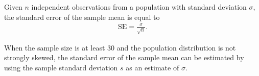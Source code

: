 \begin{spacing}{1.5}

\begin{termBox}{
		Given $n$ independent observations from a population with standard deviation $\sigma$, the standard error of the sample mean is equal to \vspace{-1mm}
		\begin{align*}
		\text{SE} = \frac{\sigma}{\sqrt{n}}.
		\label{seOfXBar}
		\end{align*}\vspace{-3mm}%
		
		When the sample size is at least 30 and the population distribution is not strongly skewed, the standard error of the sample mean can be estimated by using the sample standard deviation $s$ as an estimate of $\sigma$.
	}
\end{termBox}

\end{spacing}

